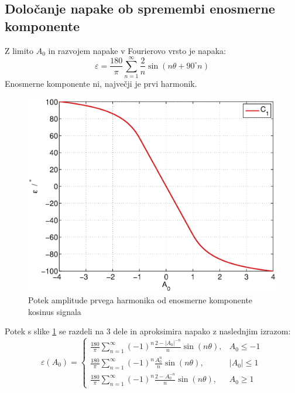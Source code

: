 \documentclass[a4paper]{article}
\begin{document}
\subsection{Določanje napake ob spremembi enosmerne komponente}

Z limito $A_0$ in razvojem napake v Fourierovo vrsto je napaka:
\begin{equation}
\label{equ:off_lim_vrsta}
\varepsilon = \frac{180}{\pi}\sum_{n=1}^{\infty}\frac{2}{n} \sin (n \theta+ 90^\circ n)
\end{equation}
Enosmerne komponente ni,  največji je prvi harmonik.
\begin{figure}[!htb]
	\begin{center}
		\includegraphics[width=\linewidth]{./Slike/off.eps}
		\caption{Potek amplitude prvega harmonika od enosmerne komponente kosinus signala} \label{fig:off}
	\end{center}
\end{figure}
Potek s slike \ref{fig:off} se razdeli na 3 dele in aproksimira napako z naslednjim izrazom:
\begin{equation}
\label{equ:offc_err}
\varepsilon(A_0)=
\begin{cases}
\frac{180}{\pi}\sum_{n=1}^{\infty}(-1)^n\frac{2-|A_0|^{-n}}{n} \sin (n \theta ), & A_0\leq -1 \\
\frac{180}{\pi}\sum_{n=1}^{\infty}(-1)^n\frac{A_0^n}{n} \sin (n \theta ), & |A_0|\leq 1 \\
\frac{180}{\pi}\sum_{n=1}^{\infty}(-1)^n\frac{2-A_0^{-n}}{n} \sin (n \theta ), & A_0\geq 1
\end{cases}
\end{equation}
\end{document}
